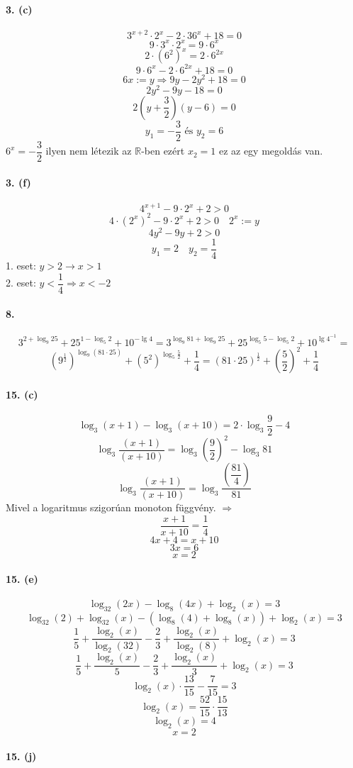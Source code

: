 \documentclass[12pt,a4paper,fleqn]{article}
\newcommand{\myparagraph}[1]{\paragraph{#1}\mbox{}}
\begin{document}
\myparagraph{3. (c)}
\[ 3^{x+2} \cdot 2^x - 2 \cdot 36^x + 18 = 0 \]
\[ 9 \cdot 3^x \cdot 2^x = 9 \cdot 6^x \]
\[ 2 \cdot (6^2)^x= 2 \cdot 6^{2x} \]
\[ 9 \cdot 6^x - 2 \cdot 6^{2x} + 18 = 0 \]
\[ 6x := y \Rightarrow 9y - 2y^2 + 18 = 0 \]
\[ 2y^2 - 9y - 18 = 0 \]
\[ 2(y+\dfrac{3}{2})(y-6) = 0 \]
\[ y_1=-\dfrac{3}{2} \text{ és } y_2 = 6 \]
$ 6^x = -\dfrac{3}{2}$ ilyen nem létezik az $\mathbb{R}$-ben ezért $ x_2 = 1 $
  ez az egy megoldás van.


\myparagraph{3. (f)}
\[ 4^{x+1} - 9 \cdot 2^x + 2 > 0 \]
\[ 4 \cdot (2^x)^2 - 9 \cdot 2^x + 2 > 0 \quad 2^x:=y\]
\[ 4y^2 - 9y + 2 > 0 \]
\[ y_1 = 2 \quad y_2 = \dfrac{1}{4} \]
1. eset: $y > 2 \rightarrow x > 1$ \\
2. eset: $y < \dfrac{1}{4} \Rightarrow x < -2 $


\myparagraph{8.}
\[ 3^{2+\log_9 25} + 25^{1-\log_5 2} + 10^{-\lg 4} = 3^{\log_9 81 + \log_9 25} +
  25^{\log_5 5 - \log_5 2} + 10^{\lg 4^{-1}} = \]
\[ \left(9^{\frac{1}{2}}\right)^{\log_9 (81 \cdot 25)} +
  \left(5^2\right)^{\log_5 \frac{5}{2}} + \dfrac{1}{4} =
  (81 \cdot 25)^{\frac{1}{2}} + \left(\dfrac{5}{2}\right)^2 + \dfrac{1}{4} \]

\myparagraph{15. (c)}
\[ \log_3 (x+1) - \log_3 (x+10) = 2 \cdot \log_3 \frac{9}{2} - 4 \]
\[ \log_3 \dfrac{(x+1)}{(x+10)} = \log_3 \left(\dfrac{9}{2}\right)^2 - \log_3 81 \]
\[ \log_3 \dfrac{(x+1)}{(x+10)} = \log_3 \dfrac{\left(\dfrac{81}{4}\right)}{81} \]
Mivel a logaritmus szigorúan monoton függvény. $\Longrightarrow$
\[ \dfrac{x+1}{x+10} = \dfrac{1}{4} \]
\[ 4x + 4 = x + 10 \]
\[ 3x = 6 \]
\[ x = 2 \]

\myparagraph{15. (e)}
\[ \log_{32} (2x) - \log_8 (4x) + \log_2 (x) = 3 \]
\[ \log_{32} (2) + \log_{32} (x) - (\log_8 (4) + \log_8 (x)) + \log_2 (x) = 3 \]
\[ \dfrac{1}{5} + \dfrac{\log_2 (x)}{\log_2 (32)} - \dfrac{2}{3} +
  \dfrac{\log_2 (x)}{\log_2 (8)} + \log_2 (x) = 3\]
\[ \dfrac{1}{5} + \dfrac{\log_2 (x)}{5} - \dfrac{2}{3} + \dfrac{\log_2 (x)}{3} +
  \log_2 (x) = 3 \]
\[ \log_2 (x) \cdot \dfrac{13}{15} - \dfrac{7}{15} = 3 \]
\[ \log_2 (x) = \dfrac{52}{15} \cdot \dfrac{15}{13} \]
\[ \log_2 (x) = 4 \]
\[ x = 2 \]

\clearpage
\myparagraph{15. (j)}
\end{document}
